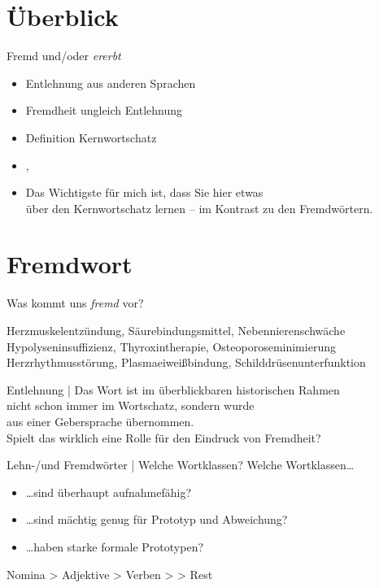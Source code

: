 \section{Überblick}

\begin{frame}
  {Fremd und\slash oder \textit{ererbt}}
  \onslide<+->
  \begin{itemize}[<+->]
    \item Entlehnung aus anderen Sprachen
    \item Fremdheit ungleich Entlehnung
    \item Definition Kernwortschatz
      \Zeile
    \item \citet{Eisenberg2018}, \citet{Schaefer2018b}\\
      \Zeile
    \item Das Wichtigste für mich ist, dass Sie hier etwas\\
      über den \alert{Kernwortschatz} lernen -- im Kontrast zu den Fremdwörtern.
  \end{itemize}
\end{frame}

\section{Fremdwort}

\begin{frame}
  {Was kommt uns \textit{fremd} vor?}
  \onslide<+->
  \onslide<+->
  \begin{exe}
    \ex Herzmuskelentzündung, Säurebindungsmittel, Nebennierenschwäche
    \pause
    \Halbzeile
    \ex Hypolyseninsuffizienz, Thyroxintherapie, Osteoporoseminimierung
    \pause
    \Halbzeile
    \ex Herzrhythmusstörung, Plasmaeiweißbindung, Schilddrüsenunterfunktion
  \end{exe}
  \onslide<+->
  \Zeile
  \alert{Entlehnung} | Das Wort ist im überblickbaren historischen Rahmen\\
  nicht schon immer im Wortschatz, sondern wurde\\
  aus einer Gebersprache übernommen.\\
  \onslide<+->
  \Zeile
  Spielt das wirklich eine Rolle für den Eindruck von \alert{Fremdheit}?
\end{frame}

\begin{frame}
  {Lehn-\slash und Fremdwörter | Welche Wortklassen?}
  \onslide<+->
  \onslide<+->
  Welche Wortklassen…\\
  \Halbzeile
  \begin{itemize}[<+->]
    \item \ldots sind überhaupt \alert{aufnahmefähig}?
    \item \ldots sind mächtig genug für Prototyp und Abweichung?
    \item \ldots haben starke formale Prototypen?
  \end{itemize}
  \onslide<+->
  \Zeile
  \alert{Nomina} > \alert{Adjektive} > \alert{Verben} >  > Rest
\end{frame}

